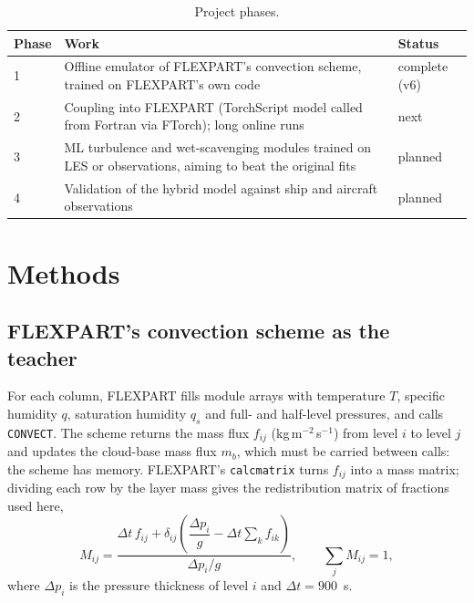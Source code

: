 \documentclass[11pt,a4paper]{article}
\begin{document}
\begin{table}[h]
\centering\small
\begin{tabularx}{\textwidth}{lYl}
\toprule
Phase & Work & Status \\
 & Offline emulator of FLEXPART's convection scheme, trained on FLEXPART's own code & complete (v6) \\
2 & Coupling into FLEXPART (TorchScript model called from Fortran via FTorch); long online runs & next \\
3 & ML turbulence and wet-scavenging modules trained on LES or observations, aiming to beat the original fits & planned \\
4 & Validation of the hybrid model against ship and aircraft observations & planned \\
\bottomrule
\end{tabularx}
\caption{Project phases.}
\label{tab:phases}
\end{table}

\section{Methods}

\subsection{FLEXPART's convection scheme as the teacher}
For each column, FLEXPART fills module arrays with temperature $T$, specific humidity $q$, saturation
humidity $q_s$ and full- and half-level pressures, and calls \texttt{CONVECT}. The scheme returns the
mass flux $f_{ij}$ (kg\,m$^{-2}$\,s$^{-1}$) from level $i$ to level $j$ and updates the cloud-base mass
flux $m_b$, which must be carried between calls: the scheme has memory. FLEXPART's \texttt{calcmatrix}
turns $f_{ij}$ into a mass matrix; dividing each row by the layer mass gives the redistribution
matrix of fractions used here,
\begin{equation}
M_{ij} = \frac{\Delta t\, f_{ij} + \delta_{ij}\left(\dfrac{\Delta p_i}{g} - \Delta t\sum_k f_{ik}\right)}{\Delta p_i / g},
\qquad \sum_j M_{ij} = 1 ,
\end{equation}
where $\Delta p_i$ is the pressure thickness of level $i$ and $\Delta t = 900$~s.
\end{document}
